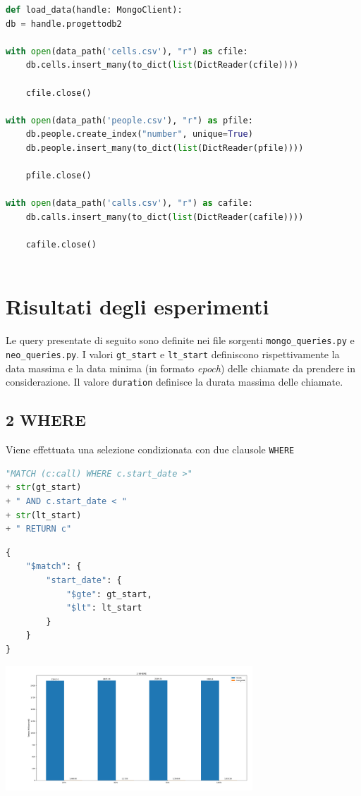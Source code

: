     \begin{lstlisting}[language=Python, caption=load\_data()]
def load_data(handle: MongoClient):
db = handle.progettodb2

with open(data_path('cells.csv'), "r") as cfile:
    db.cells.insert_many(to_dict(list(DictReader(cfile))))

    cfile.close()

with open(data_path('people.csv'), "r") as pfile:
    db.people.create_index("number", unique=True)
    db.people.insert_many(to_dict(list(DictReader(pfile))))

    pfile.close()

with open(data_path('calls.csv'), "r") as cafile:
    db.calls.insert_many(to_dict(list(DictReader(cafile))))

    cafile.close()
        
    \end{lstlisting}


\pagebreak
\section{Risultati degli esperimenti}
Le query presentate di seguito sono definite nei file sorgenti \texttt{mongo\_queries.py} e 
\texttt{neo\_queries.py}. I valori \texttt{gt\_start} e \texttt{lt\_start} definiscono
rispettivamente la data massima e la data minima (in formato \textit{epoch}) delle chiamate da prendere
in considerazione. Il valore \texttt{duration} definisce la durata massima delle chiamate.


    \subsection{2 WHERE}
    Viene effettuata una selezione condizionata con due clausole \texttt{WHERE}

    \begin{lstlisting}[language=Python, caption=Neo4j]
"MATCH (c:call) WHERE c.start_date >" 
+ str(gt_start) 
+ " AND c.start_date < " 
+ str(lt_start) 
+ " RETURN c"
    \end{lstlisting}

    \begin{lstlisting}[language=Python, caption=MongoDB]
{
    "$match": {
        "start_date": {
            "$gte": gt_start,
            "$lt": lt_start
        }
    }
}
    \end{lstlisting}

    \includegraphics[width=350px, keepaspectratio]{query1.png}


